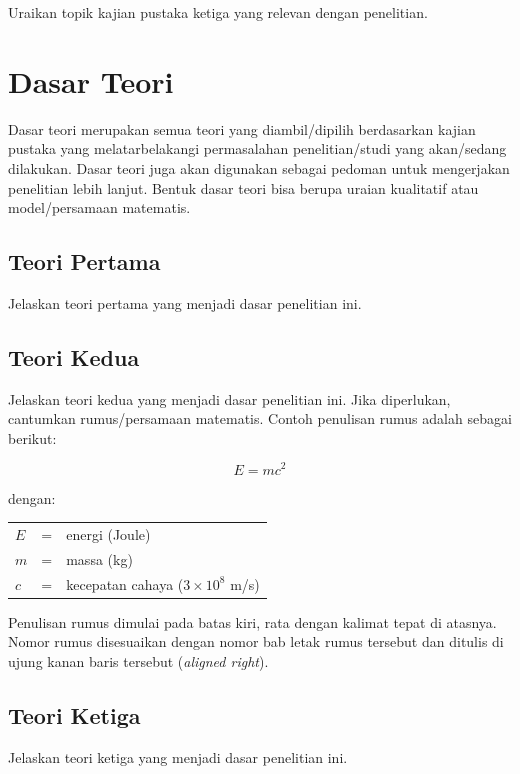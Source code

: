 Uraikan topik kajian pustaka ketiga yang relevan dengan penelitian.

\section{Dasar Teori}

Dasar teori merupakan semua teori yang diambil/dipilih berdasarkan kajian pustaka yang melatarbelakangi permasalahan penelitian/studi yang akan/sedang dilakukan. Dasar teori juga akan digunakan sebagai pedoman untuk mengerjakan penelitian lebih lanjut. Bentuk dasar teori bisa berupa uraian kualitatif atau model/persamaan matematis.

\subsection{Teori Pertama}

Jelaskan teori pertama yang menjadi dasar penelitian ini.

\subsection{Teori Kedua}

Jelaskan teori kedua yang menjadi dasar penelitian ini. Jika diperlukan, cantumkan rumus/persamaan matematis. Contoh penulisan rumus adalah sebagai berikut:

\begin{equation}
    E = mc^2
    \label{eq:einstein}
\end{equation}

\noindent dengan:
\begin{tabular}{@{}lcl@{}}
    $E$ & = & energi (Joule) \\
    $m$ & = & massa (kg) \\
    $c$ & = & kecepatan cahaya ($3 \times 10^8$ m/s)
\end{tabular}

\vspace{0.5cm}

Penulisan rumus dimulai pada batas kiri, rata dengan kalimat tepat di atasnya. Nomor rumus disesuaikan dengan nomor bab letak rumus tersebut dan ditulis di ujung kanan baris tersebut (\textit{aligned right}).

\subsection{Teori Ketiga}

Jelaskan teori ketiga yang menjadi dasar penelitian ini.

